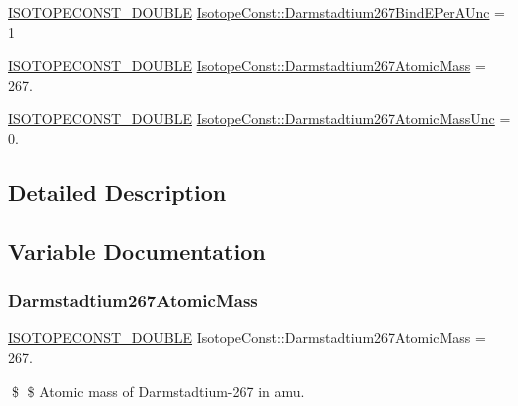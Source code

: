 \begin{DoxyCompactItemize}
\item 
\mbox{\hyperlink{group___isotope_const-_macros_ga8f45a7272ce02c0b4c65c44636ed719a}{I\+S\+O\+T\+O\+P\+E\+C\+O\+N\+S\+T\+\_\+\+D\+O\+U\+B\+LE}} \mbox{\hyperlink{group___isotope_const-_darmstadtium-_ds267_gafa57d7fa5b00e821982c16ef7a55ee99}{Isotope\+Const\+::\+Darmstadtium267\+Bind\+E\+Per\+A\+Unc}} = 1
\item 
\mbox{\hyperlink{group___isotope_const-_macros_ga8f45a7272ce02c0b4c65c44636ed719a}{I\+S\+O\+T\+O\+P\+E\+C\+O\+N\+S\+T\+\_\+\+D\+O\+U\+B\+LE}} \mbox{\hyperlink{group___isotope_const-_darmstadtium-_ds267_gaae01527a9875342fe9d9183128677709}{Isotope\+Const\+::\+Darmstadtium267\+Atomic\+Mass}} = 267.
\item 
\mbox{\hyperlink{group___isotope_const-_macros_ga8f45a7272ce02c0b4c65c44636ed719a}{I\+S\+O\+T\+O\+P\+E\+C\+O\+N\+S\+T\+\_\+\+D\+O\+U\+B\+LE}} \mbox{\hyperlink{group___isotope_const-_darmstadtium-_ds267_ga5ba6db7dd137d0230fea7c352f1c79d8}{Isotope\+Const\+::\+Darmstadtium267\+Atomic\+Mass\+Unc}} = 0.
\end{DoxyCompactItemize}


\subsection{Detailed Description}


\subsection{Variable Documentation}
\mbox{\label{group___isotope_const-_darmstadtium-_ds267_gaae01527a9875342fe9d9183128677709}} 
\subsubsection{\texorpdfstring{Darmstadtium267\+Atomic\+Mass}{Darmstadtium267AtomicMass}}
{\footnotesize\ttfamily \mbox{\hyperlink{group___isotope_const-_macros_ga8f45a7272ce02c0b4c65c44636ed719a}{I\+S\+O\+T\+O\+P\+E\+C\+O\+N\+S\+T\+\_\+\+D\+O\+U\+B\+LE}} Isotope\+Const\+::\+Darmstadtium267\+Atomic\+Mass = 267.}

\$ \$ Atomic mass of Darmstadtium-\/267 in amu. \mbox{\label{group___isotope_const-_darmstadtium-_ds267_ga5ba6db7dd137d0230fea7c352f1c79d8}} 
